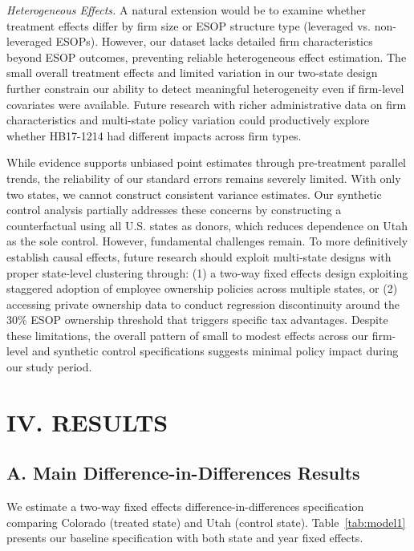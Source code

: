 \documentclass[12pt]{article}
\renewcommand{\normalsize}{\fontsize{12pt}{14pt}\selectfont}
\begin{document}
\textit{Heterogeneous Effects.} A natural extension would be to examine whether treatment effects differ by firm size or ESOP structure type (leveraged vs. non-leveraged ESOPs). However, our dataset lacks detailed firm characteristics beyond ESOP outcomes, preventing reliable heterogeneous effect estimation. The small overall treatment effects and limited variation in our two-state design further constrain our ability to detect meaningful heterogeneity even if firm-level covariates were available. Future research with richer administrative data on firm characteristics and multi-state policy variation could productively explore whether HB17-1214 had different impacts across firm types.

While evidence supports unbiased point estimates through pre-treatment parallel trends, the reliability of our standard errors remains severely limited. With only two states, we cannot construct consistent variance estimates. Our synthetic control analysis partially addresses these concerns by constructing a counterfactual using all U.S. states as donors, which reduces dependence on Utah as the sole control. However, fundamental challenges remain.  To more definitively establish causal effects, future research should exploit multi-state designs with proper state-level clustering through: (1) a two-way fixed effects design exploiting staggered adoption of employee ownership policies across multiple states, or (2) accessing private ownership data to conduct regression discontinuity around the 30\% ESOP ownership threshold that triggers specific tax advantages. Despite these limitations, the overall pattern of small to modest effects across our firm-level and synthetic control specifications suggests minimal policy impact during our study period.

\section*{\centering \normalsize \textbf{IV. RESULTS}}

\subsection*{A. Main Difference-in-Differences Results}

We estimate a two-way fixed effects difference-in-differences specification comparing Colorado (treated state) and Utah (control state). Table~\ref{tab:model1} presents our baseline specification with both state and year fixed effects.
\end{document}
